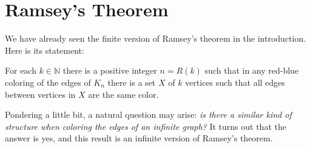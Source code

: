 \section{Ramsey's Theorem}
We have already seen the finite version of Ramsey's theorem in the introduction. Here is its statement:
\begin{theorem}
For each \( k \in \mathbb{N} \) there is a positive integer \( n = R(k) \) such that in any red-blue coloring of the edges of \( K_{n}  \) there is a set \( X \) of \( k \) vertices such that all edges between vertices in \( X \) are the same color.
\end{theorem}
Pondering a little bit, a natural question may arise: \emph{is there a similar kind of structure when coloring the edges of an infinite graph?} It turns out that the answer is yes, and this result is an infinite version of Ramsey's theorem.


